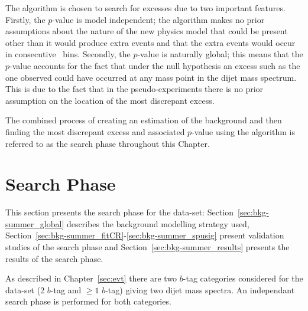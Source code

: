 The \bh{} algorithm is chosen to search for excesses due to two important features.
Firstly, the \bh{} \mbox{$p$-value} is model independent;
the algorithm makes no prior assumptions about the nature of the new physics model that could be present
other than it would produce extra events and that the extra events would occur in consecutive~\mjj{} bins.
Secondly, the \bh{} \mbox{$p$-value} is naturally global;
this means that the \mbox{$p$-value} accounts for the fact that under the null hypothesis an excess such as the one observed could have occurred at any mass point in the dijet mass spectrum.
This is due to the fact that in the pseudo-experiments there is no prior assumption on the location of the most discrepant excess.


The combined process of creating an estimation of the background and then
finding the most discrepant excess and associated $p$-value using the \bh{} algorithm
is referred to as the search phase throughout this Chapter.

\section{\summer{} Search Phase}
\label{sec:bkg-summer}

This section presents the search phase for the \summer{} data-set:
Section~\ref{sec:bkg-summer_global} describes the background modelling strategy used,
Section~\ref{sec:bkg-summer_fitCR}-\ref{sec:bkg-summer_spusig}
present validation studies of the search phase
and Section~\ref{sec:bkg-summer_results} presents the results of the search phase.

As described in Chapter~\ref{sec:evt}
there are two $b$-tag categories considered for the \summer{} data-set 
(2 $b$-tag and $\geq1$ $b$-tag) giving two dijet mass spectra.
An independant search phase is performed for both categories.

